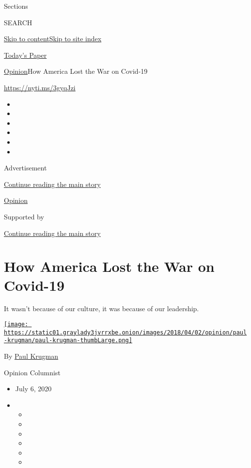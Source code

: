 Sections

SEARCH

\protect\hyperlink{site-content}{Skip to
content}\protect\hyperlink{site-index}{Skip to site index}

\href{https://myaccount.nytimes3xbfgragh.onion/auth/login?response_type=cookie\&client_id=vi}{}

\href{https://www.nytimes3xbfgragh.onion/section/todayspaper}{Today's
Paper}

\href{/section/opinion}{Opinion}\textbar{}How America Lost the War on
Covid-19

\href{https://nyti.ms/3gyqJzi}{https://nyti.ms/3gyqJzi}

\begin{itemize}
\item
\item
\item
\item
\item
\item
\end{itemize}

Advertisement

\protect\hyperlink{after-top}{Continue reading the main story}

\href{/section/opinion}{Opinion}

Supported by

\protect\hyperlink{after-sponsor}{Continue reading the main story}

\hypertarget{how-america-lost-the-war-on-covid-19}{%
\section{How America Lost the War on
Covid-19}\label{how-america-lost-the-war-on-covid-19}}

It wasn't because of our culture, it was because of our leadership.

\href{https://www.nytimes3xbfgragh.onion/by/paul-krugman}{\texttt{[image: https://static01.graylady3jvrrxbe.onion/images/2018/04/02/opinion/paul-krugman/paul-krugman-thumbLarge.png]}}

By \href{https://www.nytimes3xbfgragh.onion/by/paul-krugman}{Paul
Krugman}

Opinion Columnist

\begin{itemize}
\item
  July 6, 2020
\item
  \begin{itemize}
  \item
  \item
  \item
  \item
  \item
  \item
  \end{itemize}
\end{itemize}

